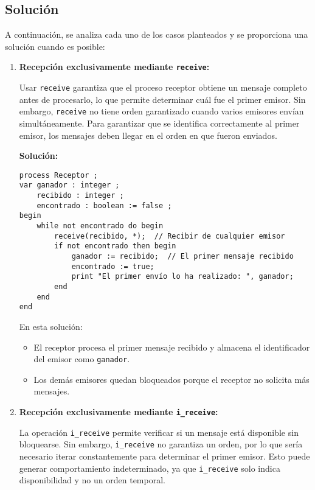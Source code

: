 \documentclass[a4paper,12pt]{article}
\begin{document}
\subsection{Solución}

A continuación, se analiza cada uno de los casos planteados y se proporciona una solución cuando es posible:
\begin{enumerate}[label=\alph*)]

\item \textbf{ Recepción exclusivamente mediante \texttt{receive}:}

Usar \texttt{receive} garantiza que el proceso receptor obtiene un mensaje completo antes de procesarlo, lo que permite determinar cuál fue el primer emisor. Sin embargo, \texttt{receive} no tiene orden garantizado cuando varios emisores envían simultáneamente. Para garantizar que se identifica correctamente al primer emisor, los mensajes deben llegar en el orden en que fueron enviados.

\textbf{Solución:}

\begin{lstlisting}[style=customcpp]
process Receptor ;
var ganador : integer ;
    recibido : integer ;
    encontrado : boolean := false ;
begin
    while not encontrado do begin
        receive(recibido, *);  // Recibir de cualquier emisor
        if not encontrado then begin
            ganador := recibido;  // El primer mensaje recibido
            encontrado := true;
            print "El primer envío lo ha realizado: ", ganador;
        end
    end
end
\end{lstlisting}

En esta solución:
\begin{itemize}
    \item El receptor procesa el primer mensaje recibido y almacena el identificador del emisor como \texttt{ganador}.
    \item Los demás emisores quedan bloqueados porque el receptor no solicita más mensajes.
\end{itemize}

\item \textbf{ Recepción exclusivamente mediante \texttt{i\_receive}:}

La operación \texttt{i\_receive} permite verificar si un mensaje está disponible sin bloquearse. Sin embargo, \texttt{i\_receive} no garantiza un orden, por lo que sería necesario iterar constantemente para determinar el primer emisor. Esto puede generar comportamiento indeterminado, ya que \texttt{i\_receive} solo indica disponibilidad y no un orden temporal.


\end{enumerate}
\end{document}

